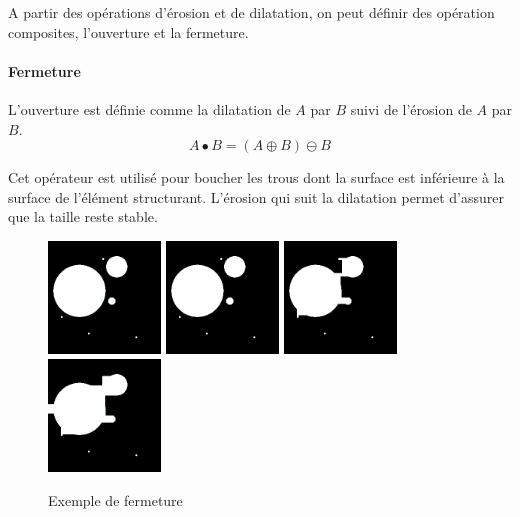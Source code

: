 {A partir des opérations d'érosion et de dilatation, on peut définir des opération composites, l'ouverture et la fermeture.

\paragraph{Fermeture}
L'ouverture est définie comme la dilatation de $A$ par $B$ suivi de l'érosion de $A$ par $B$.
\begin{equation}
 A \bullet B = (A \oplus B) \ominus B
\end{equation}

Cet opérateur est utilisé pour boucher les trous dont la surface est inférieure à la surface de l'élément structurant. L'érosion qui suit la dilatation permet d'assurer que la taille reste stable.

\begin{figure}
  \centering
  \includegraphics[height=3cm]{Images/morpho_init.png}
  \includegraphics[height=3cm]{Images/morpho_close_k5.png}
  \includegraphics[height=3cm]{Images/morpho_close_k21.png}
  \includegraphics[height=3cm]{Images/morpho_close_k31.png}
  \label{fig:morpho_femerture}
  \caption{Exemple de fermeture}
\end{figure}

}

